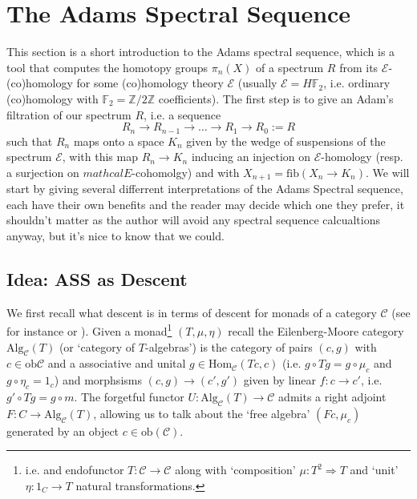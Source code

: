 \newpage
\section{The Adams Spectral Sequence}

This section is a short introduction to the Adams spectral sequence, which is a tool that computes the homotopy groups $\pi_n(X)$ of a spectrum $R$ from its $\mathcal{E}$-(co)homology for some (co)homology theory $\mathcal{E}$ (usually $\mathcal{E}=H\mathbb{F}_2$, i.e. ordinary (co)homology with $\mathbb{F}_2=\mathbb{Z}/2\mathbb{Z}$ coefficients). The first step is to give an Adam's filtration of our spectrum $R$, i.e. a sequence 
	\[
	R_n \to R_{n-1} \to \dots \to R_1 \to R_0 := R
	\]
such that $R_n$ maps onto a space $K_n$ given by the wedge of suspensions of the spectrum $\mathcal{E}$, with this map $R_n \to K_n$ inducing an injection on $\mathcal{E}$-homology (resp. a surjection on $mathcal{E}$-cohomolgy) and with $X_{n+1} = \text{fib}(X_n \to K_n)$. We will start by giving several differrent interpretations of the Adams Spectral sequence, each have their own benefits and the reader may decide which one they prefer, it shouldn't matter as the author will avoid any spectral sequence calcualtions anyway, but it's nice to know that we could.


\newpage
\subsection{Idea: ASS as Descent}
We first recall what descent is in terms of descent for monads of a category $\mathcal{C}$ (see for instance \cite{Hess18} or \cite{Mesablishvili06}). Given a monad\footnote{i.e. and endofunctor $T : \mathcal{C} \to \mathcal{C}$ along with `composition' $\mu : T^2 \Rightarrow T$ and `unit' $\eta : 1_C \to T$ natural transformations.} $(T, \mu, \eta)$ recall the Eilenberg-Moore category $\text{Alg}_\mathcal{C}(T)$ (or `category of $T$-algebras') is the category of pairs $(c,g)$ with $c \in \text{ob}\mathcal{C}$ and a associative and unital $g \in \text{Hom}_\mathcal{C}(Tc,c)$ (i.e. $g \circ Tg = g \circ \mu_c$ and $g \circ \eta_c = 1_c$) and morphsisms $(c,g) \to (c',g')$ given by linear $f : c \to c'$, i.e. $g' \circ Tg = g \circ m$. The forgetful functor $U : \text{Alg}_\mathcal{C}(T) \to \mathcal{C}$ admits a right adjoint $F : C \to \text{Alg}_\mathcal{C}(T)$, allowing us to talk about the `free algebra' $(Fc, \mu_c)$ generated by an object $c \in \text{ob}(\mathcal{C})$. 

